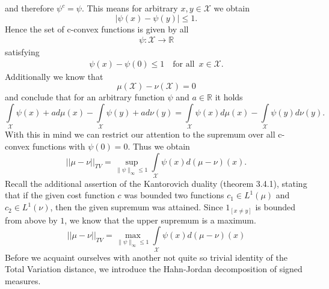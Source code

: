 \documentclass[11pt,a4paper]{article}
\begin{document}
and therefore $\psi^c=\psi$. This means for arbitrary $x,y\in\mathcal{X}$ we obtain
\[
|\psi(x)-\psi(y)|\leq{}1.
\]
Hence the set of c-convex functions is given by all 
\begin{align*}
\psi:\mathcal{X}\rightarrow\mathbb{R}
\end{align*}
satisfying
\begin{align*}
\psi(x)-\psi(0)\leq{}1\quad\text{for all}\,\,\, x\in\mathcal{X}.
\end{align*}
Additionally we know that 
\[
\mu(\mathcal{X})-\nu(\mathcal{X})=0
\]
and conclude that for an arbitrary function $\psi$ and $a\in\mathbb{R}$ it holds
\[
\int\limits_{\mathcal{X}}\psi(x)+ad\mu(x)-\int\limits_{\mathcal{X}}\psi(y)+ad\nu(y) = \int\limits_{\mathcal{X}}\psi(x)d\mu(x)-\int\limits_{\mathcal{X}}\psi(y)d\nu(y).
\]
With this in mind we can restrict our attention to the supremum over all c-convex functions with $\psi(0)=0$. Thus we obtain
\[
||\mu-\nu||_{TV}=\sup\limits_{\|\psi\|_{\infty}\leq{}1}\int\limits_{\mathcal{X}}\psi(x)d(\mu-\nu)(x).
\]
Recall the additional assertion of the Kantorovich duality (theorem 3.4.1), stating that if the given cost function $c$ was bounded two functions $c_1\in{}L^1(\mu)$ and $c_2\in{}L^1(\nu)$, then the given supremum was attained. Since $1_{[x\neq{}y]}$ is bounded from above by $1$, we know that the upper supremum is a maximum.
\[
||\mu-\nu||_{TV}=\max\limits_{\|\psi\|_{\infty}\leq{}1}\int\limits_{\mathcal{X}}\psi(x)d(\mu-\nu)(x)
\]
Before we acquaint ourselves with another not quite so trivial identity of the Total Variation distance, we introduce the Hahn-Jordan decomposition of signed measures.
\end{document}

